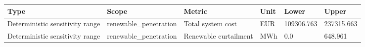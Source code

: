 \begin{tabular}{llllll}
\toprule
Type & Scope & Metric & Unit & Lower & Upper \\
\midrule
Deterministic sensitivity range & renewable\_penetration & Total system cost & EUR & 109306.763 & 237315.663 \\
Deterministic sensitivity range & renewable\_penetration & Renewable curtailment & MWh & 0.0 & 648.961 \\
\bottomrule
\end{tabular}
